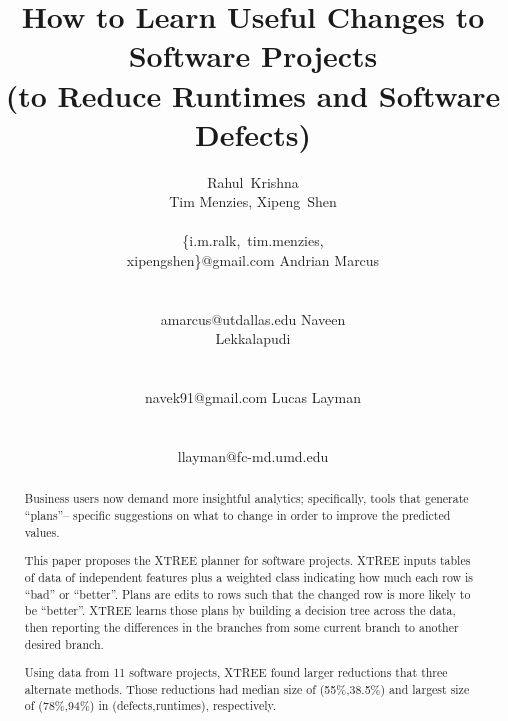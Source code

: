 \documentclass{sig-alternate}
\begin{document}
  


\title{How to Learn Useful Changes to Software Projects\\(to Reduce Runtimes and Software Defects)}
\author{  
\alignauthor
Rahul~Krishna\\Tim Menzies, Xipeng~Shen \\
       \\
       {\{i.m.ralk,~tim.menzies,\\xipengshen\}@gmail.com}
\alignauthor
Andrian Marcus \\
        \\ 
       \\ 
       {amarcus@utdallas.edu}
       \alignauthor
Naveen  \\ Lekkalapudi\\
  \\ 
       \\ 
       {navek91@gmail.com}
\alignauthor
Lucas Layman \\
        \\ 
       \\ 
       {llayman@fc-md.umd.edu}
\setlength{\columnsep}{7mm}
}
\maketitle
\begin{abstract}
 Business users now demand more insightful
 analytics; specifically, tools that generate ``plans''--
  specific suggestions on  what to change  in order to
 improve  the predicted values.
 
 This paper proposes  the  XTREE planner for software projects. 
XTREE inputs tables of data of independent features plus a   weighted class
  indicating how much each row is  ``bad'' or  ``better''. 
  Plans are edits to  
rows such that the changed row is more likely to be ``better''.  XTREE
learns those plans by building a decision tree across the data, then reporting
the differences in the branches from some current branch to another desired branch.

Using data from 11 software projects,  XTREE found   larger reductions that three
alternate methods.  Those reductions had 
median size of (55\%,38.5\%) and   largest size of (78\%,94\%) in
(defects,runtimes), respectively.
\end{abstract}
\end{document}
